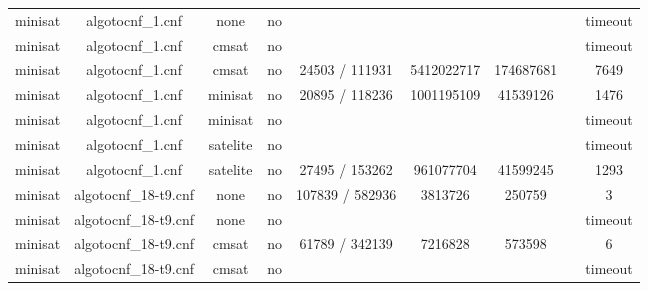 \begin{appendices}
\begin{table}[p]
\begin{center}
\begin{tabular}{l|cccccccc}
  minisat                        & algotocnf\_1.cnf               & none       & no    &            &           &           &            & timeout \\ %
  minisat                        & algotocnf\_1.cnf               & cmsat      & no    &            &           &           &            & timeout \\ %
  minisat                        & algotocnf\_1.cnf               & cmsat      & no    & 24503 / 111931 & 5412022717 & 174687681 &            & 7649 \\ %
  minisat                        & algotocnf\_1.cnf               & minisat    & no    & 20895 / 118236 & 1001195109 & 41539126  &            & 1476 \\ %
  minisat                        & algotocnf\_1.cnf               & minisat    & no    &            &           &           &            & timeout \\ %
  minisat                        & algotocnf\_1.cnf               & satelite   & no    &            &           &           &            & timeout \\ %
  minisat                        & algotocnf\_1.cnf               & satelite   & no    & 27495 / 153262 & 961077704 & 41599245  &            & 1293 \\ %
  minisat                        & algotocnf\_18-t9.cnf           & none       & no    & 107839 / 582936 & 3813726   & 250759    &            & 3 \\ %
  minisat                        & algotocnf\_18-t9.cnf           & none       & no    &            &           &           &            & timeout \\ %
  minisat                        & algotocnf\_18-t9.cnf           & cmsat      & no    & 61789 / 342139 & 7216828   & 573598    &            & 6 \\ %
  minisat                        & algotocnf\_18-t9.cnf           & cmsat      & no    &            &           &           &            & timeout \\ %

\end{tabular}
\end{center}
\end{table}
\end{appendices}
